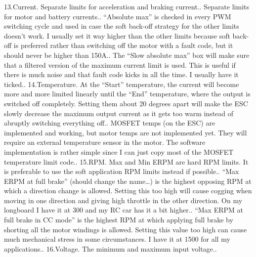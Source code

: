 \documentclass[11pt]{article}
\begin{document}
13.Current.\newline
Separate limits for acceleration and braking current..\newline
Separate limits for motor and battery currents..\newline
“Absolute max” is checked in every PWM switching cycle and used in case the soft back-off strategy for the other limits doesn’t work. I usually set it way higher than the other limits because soft back-off is preferred rather than switching off the motor with a fault code, but it should never be higher than 150A..\newline
The “Slow absolute max” box will make sure that a filtered version of the maximum current limit is used. This is useful if there is much noise and that fault code kicks in all the time. I usually have it ticked..\newline
14.Temperature.\newline
At the “Start” temperature, the current will become more and more limited linearly until the “End” temperature, where the output is switched off completely. Setting them about 20 degrees apart will make the ESC slowly decrease the maximum output current as it gets too warm instead of abruptly switching everything off..\newline
MOSFET temps (on the ESC) are implemented and working, but motor temps are not implemented yet. They will require an external temperature sensor in the motor. The software implementation is rather simple since I can just copy most of the MOSFET temperature limit code..\newline
15.RPM.\newline
Max and Min ERPM are hard RPM limits. It is preferable to use the soft application RPM limits instead if possible..\newline
“Max ERPM at full brake” (should change the name…) is the highest opposing RPM at which a direction change is allowed. Setting this too high will cause cogging when moving in one direction and giving high throttle in the other direction. On my longboard I have it at 300 and my RC car has it a bit higher..\newline
“Max ERPM at full brake in CC mode” is the highest RPM at which applying full brake by shorting all the motor windings is allowed. Setting this value too high can cause much mechanical stress in some circumstances. I have it at 1500 for all my applications.\newline.
16.Voltage.\newline
The minimum and maximum input voltage..\newline
\end{document}
